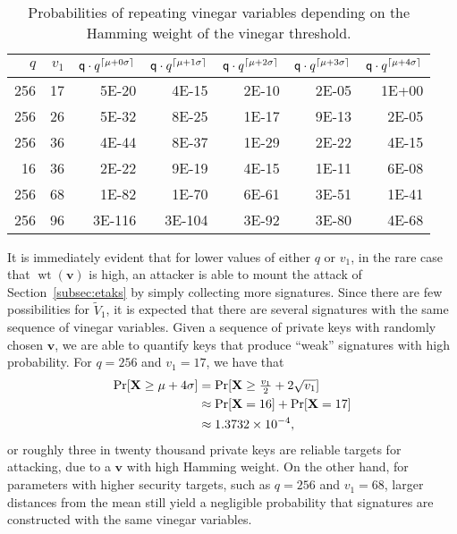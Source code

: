 \documentclass[12pt, a4paper, oneside]{memoir}
\DeclareMathOperator*{\wt}{wt}
\DeclarePairedDelimiter{\ceil}{\lceil}{\rceil}
\theoremstyle{definition}
\begin{document}
\begin{table}[htbp]
  \renewcommand{\arraystretch}{1.2}
  \setlength{\tabcolsep}{7pt}
  \centering
  \caption{Probabilities of repeating vinegar variables depending on the Hamming weight of the vinegar threshold.}\label{tab:bin-prob}
  \begin{tabular}{*{7}{r}}
    \toprule
    $q$ & $v_{1}$
      & $\mathsf{q} \cdot q^{\ceil{\mu + 0\sigma}}$ 
      & $\mathsf{q} \cdot q^{\ceil{\mu + 1\sigma}}$ 
      & $\mathsf{q} \cdot q^{\ceil{\mu + 2\sigma}}$ 
      & $\mathsf{q} \cdot q^{\ceil{\mu + 3\sigma}}$ 
      & $\mathsf{q} \cdot q^{\ceil{\mu + 4\sigma}}$ \\
    \midrule
    256 &  17 & \num{ 5E-20} & \num{ 4E-15} & \num{ 2E-10} & \num{ 2E-05} & \num{ 1E+00} \\
    256 &  26 & \num{ 5E-32} & \num{ 8E-25} & \num{ 1E-17} & \num{ 9E-13} & \num{ 2E-05} \\
    256 &  36 & \num{ 4E-44} & \num{ 8E-37} & \num{ 1E-29} & \num{ 2E-22} & \num{ 4E-15} \\
     16 &  36 & \num{ 2E-22} & \num{ 9E-19} & \num{ 4E-15} & \num{ 1E-11} & \num{ 6E-08} \\
    256 &  68 & \num{ 1E-82} & \num{ 1E-70} & \num{ 6E-61} & \num{ 3E-51} & \num{ 1E-41} \\
    256 &  96 & \num{3E-116} & \num{3E-104} & \num{ 3E-92} & \num{ 3E-80} & \num{ 4E-68} \\
    \bottomrule
  \end{tabular}
\end{table}

It is immediately evident that for lower values of either $q$ or $v_{1}$, in the rare case that $\wt(\mathbf{v})$ is high, an attacker is able to mount the attack of Section~\ref{subsec:etaks} by simply collecting more signatures. Since there are few possibilities for $\widetilde{V}_{1}$, it is expected that there are several signatures with the same sequence of vinegar variables. Given a sequence of private keys with randomly chosen $\mathbf{v}$, we are able to quantify keys that produce ``weak'' signatures with high probability. For $q = 256$ and $v_{1} = 17$, we have that
\begin{align}
  \begin{split}
    \Pr[\mathbf{X} \geq \mu + 4\sigma] 
      &= \Pr[\mathbf{X} \geq \tfrac{v_{1}}{2} + 2 \sqrt{v_{1}}] \\
      &\approx \Pr[\mathbf{X} = 16] + \Pr[\mathbf{X} = 17] \\
      &\approx \num{1.3732E-4},
  \end{split}
\end{align}
or roughly three in twenty thousand private keys are reliable targets for attacking, due to a $\mathbf{v}$ with high Hamming weight. On the other hand, for parameters with higher security targets, such as $q = 256$ and $v_{1} = 68$, larger distances from the mean still yield a negligible probability that signatures are constructed with the same vinegar variables.
\end{document}

